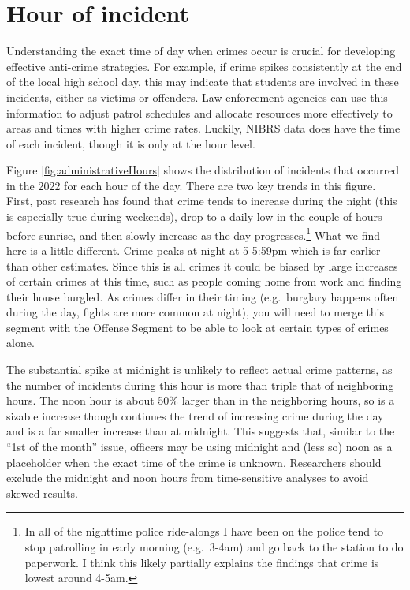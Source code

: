 \documentclass[
]{krantz}
\begin{document}
\section{Hour of incident}\label{hour-of-incident}

Understanding the exact time of day when crimes occur is
crucial for developing effective anti-crime strategies. For
example, if crime spikes consistently at the end of the
local high school day, this may indicate that students are
involved in these incidents, either as victims or offenders.
Law enforcement agencies can use this information to adjust
patrol schedules and allocate resources more effectively to
areas and times with higher crime rates. Luckily, NIBRS data
does have the time of each incident, though it is only at
the hour level.

Figure \ref{fig:administrativeHours} shows the distribution
of incidents that occurred in the 2022 for each hour of the
day. There are two key trends in this figure. First, past
research has found that crime tends to increase during the
night (this is especially true during weekends), drop to a
daily low in the couple of hours before sunrise, and then
slowly increase as the day progresses.\footnote{In all of
  the nighttime police ride-alongs I have been on the police
  tend to stop patrolling in early morning (e.g.~3-4am) and
  go back to the station to do paperwork. I think this
  likely partially explains the findings that crime is
  lowest around 4-5am.} What we find here is a little
different. Crime peaks at night at 5-5:59pm which is far
earlier than other estimates. Since this is all crimes it
could be biased by large increases of certain crimes at this
time, such as people coming home from work and finding their
house burgled. As crimes differ in their timing
(e.g.~burglary happens often during the day, fights are more
common at night), you will need to merge this segment with
the Offense Segment to be able to look at certain types of
crimes alone.

The substantial spike at midnight is unlikely to reflect
actual crime patterns, as the number of incidents during
this hour is more than triple that of neighboring hours. The
noon hour is about 50\% larger than in the neighboring
hours, so is a sizable increase though continues the trend
of increasing crime during the day and is a far smaller
increase than at midnight. This suggests that, similar to
the ``1st of the month'' issue, officers may be using
midnight and (less so) noon as a placeholder when the exact
time of the crime is unknown. Researchers should exclude the
midnight and noon hours from time-sensitive analyses to
avoid skewed results.
\end{document}
